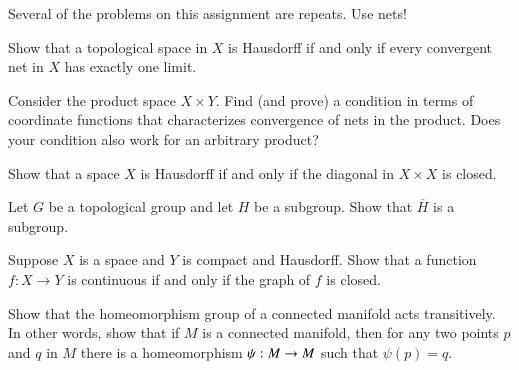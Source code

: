 \documentclass[minion]{homework651}
\begin{document}
Several of the problems on this assignment are repeats.  Use nets!
\begin{problems}

\problem Show that a topological space in $X$ is Hausdorff if and only if every 
convergent net in $X$ has exactly one limit.

\problem Consider the product space $X\times Y$.  Find (and prove) a condition
in terms of coordinate functions that characterizes convergence of nets in the product.
Does your condition also work for an arbitrary product?

\problem Show that a space $X$ is Hausdorff if and only if the diagonal in $X\times X$ is closed.

\problem Let $G$ be a topological group and let $H$ be a subgroup. Show that 
$\overline{H}$ is a subgroup.

\problem Suppose $X$ is a space and $Y$ is compact and Hausdorff.
Show that a function $f:X\rightarrow Y$ is continuous if and only if
the graph of $f$ is closed.

\problem Show that the homeomorphism group of a connected
manifold acts transitively.  In other words, show that if $M$ is a 
connected manifold, then for any two points $p$ and $q$ in $M$
there is a homeomorphism $\psi:M\rightarrow M$ such that $\psi(p)=q$.

\end{problems}
\end{document}
